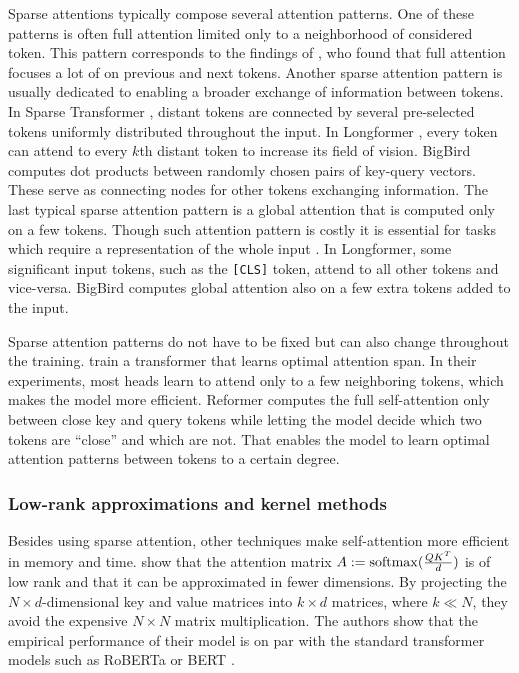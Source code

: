 Sparse attentions typically compose several attention patterns. One of these
patterns is often full attention limited only to a neighborhood of considered
token. This pattern corresponds to the findings of \cite{clark2019does}, who
found that full attention focuses a lot of on previous and next tokens. Another
sparse attention pattern is usually dedicated to enabling a broader exchange of
information between tokens. In Sparse Transformer \citep{child2019generating},
distant tokens are connected by several pre-selected tokens uniformly
distributed throughout the input. In Longformer \citep{beltagy2020longformer},
every token can attend to every $k$th distant token to increase its field of
vision. BigBird \citep{zaheer2020big} computes dot products between randomly
chosen pairs of key-query vectors. These serve as connecting nodes for other
tokens exchanging information. The last typical sparse attention pattern is a
global attention that is computed only on a few tokens. Though such attention
pattern is costly it is essential for tasks which require a representation of
the whole input \citep{beltagy2020longformer}. In Longformer, some significant
input tokens, such as the \texttt{[CLS]} token, attend to all other tokens and
vice-versa. BigBird computes global attention also on a few extra tokens added
to the input.

Sparse attention patterns do not have to be fixed but can also change
throughout the training. \cite{sukhbaatar2019adaptive} train a transformer that
learns optimal attention span. In their experiments, most heads learn to attend
only to a few neighboring tokens, which makes the model more efficient.
Reformer \citep{kitaev2020reformer} computes the full self-attention only
between close key and query tokens while letting the model decide which two
tokens are ``close'' and which are not. That enables the model to learn optimal
attention patterns between tokens to a certain degree.

\subsubsection{Low-rank approximations and kernel methods}

Besides using sparse attention, other techniques make self-attention more
efficient in memory and time. \cite{wang2020linformer} show that the
attention matrix $A := \operatorname*{softmax}(\frac{QK^T}{d})$ is of low rank and that
it can be approximated in fewer dimensions. By projecting the $N \times
d$-dimensional key and value matrices into $k \times d$ matrices, where $k\ll
N$, they avoid the expensive $N\times N$ matrix multiplication. The authors show
that the empirical performance of their model is on par with the standard
transformer models such as RoBERTa \citep{liu2019roberta} or
BERT \citep{devlin2019bert}.

